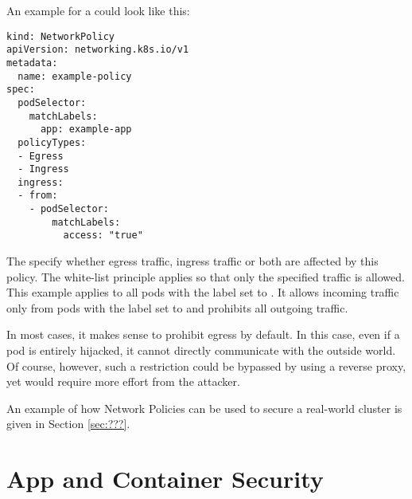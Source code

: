An example for a  could look like this:

\begin{lstlisting}[frame=single]
kind: NetworkPolicy
apiVersion: networking.k8s.io/v1
metadata:
  name: example-policy
spec:
  podSelector:
    matchLabels:
      app: example-app
  policyTypes:
  - Egress
  - Ingress
  ingress:
  - from:
    - podSelector:
        matchLabels:
          access: "true"
\end{lstlisting}

The  specify whether egress traffic, ingress traffic or both are affected by this policy. The white-list principle applies so that only the specified traffic is allowed. This example applies to all pods with the label  set to . It allows incoming traffic only from pods with the label  set to  and prohibits all outgoing traffic.

In most cases, it makes sense to prohibit egress by default. In this case, even if a pod is entirely hijacked, it cannot directly communicate with the outside world. Of course, however, such a restriction could be bypassed by using a reverse proxy, yet would require more effort from the attacker. %

An example of how Network Policies can be used to secure a real-world cluster is given in Section \ref{sec:???}. %

\section{App and Container Security} \label{sec:layer4}

